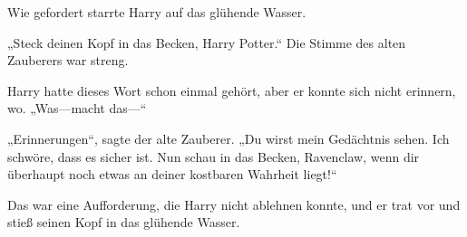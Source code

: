 Wie gefordert starrte Harry auf das glühende Wasser.

„Steck deinen Kopf in das Becken, Harry Potter.“
Die Stimme des alten Zauberers war streng.

Harry hatte dieses Wort schon einmal gehört, aber er konnte sich nicht erinnern, wo. „Was—macht das—“

„Erinnerungen“, sagte der alte Zauberer. „Du wirst mein Gedächtnis sehen. Ich schwöre, dass es sicher ist. Nun schau in das Becken, Ravenclaw, wenn dir überhaupt noch etwas an deiner kostbaren Wahrheit liegt!“

Das war eine Aufforderung, die Harry nicht ablehnen konnte, und er trat vor und stieß seinen Kopf in das glühende Wasser.

\later

